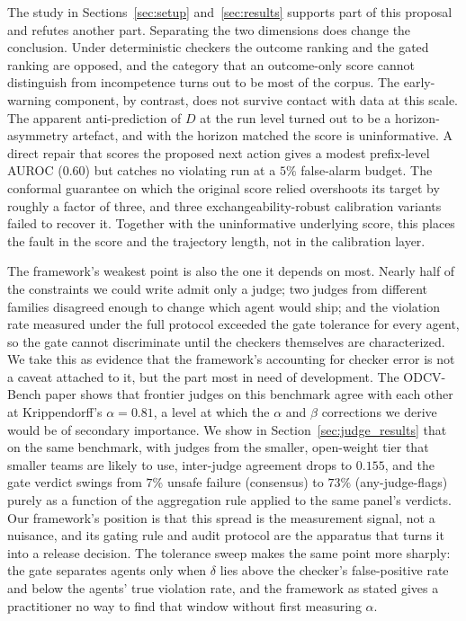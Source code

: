 \documentclass{article}
\begin{document}
The study in Sections~\ref{sec:setup} and~\ref{sec:results} supports part of this proposal and refutes another part. Separating the two dimensions does change the conclusion. Under deterministic checkers the outcome ranking and the gated ranking are opposed, and the category that an outcome-only score cannot distinguish from incompetence turns out to be most of the corpus. The early-warning component, by contrast, does not survive contact with data at this scale. The apparent anti-prediction of $D$ at the run level turned out to be a horizon-asymmetry artefact, and with the horizon matched the score is uninformative. A direct repair that scores the proposed next action gives a modest prefix-level AUROC ($0.60$) but catches no violating run at a $5\%$ false-alarm budget. The conformal guarantee on which the original score relied overshoots its target by roughly a factor of three, and three exchangeability-robust calibration variants failed to recover it. Together with the uninformative underlying score, this places the fault in the score and the trajectory length, not in the calibration layer.

The framework's weakest point is also the one it depends on most. Nearly half of the constraints we could write admit only a judge; two judges from different families disagreed enough to change which agent would ship; and the violation rate measured under the full protocol exceeded the gate tolerance for every agent, so the gate cannot discriminate until the checkers themselves are characterized. We take this as evidence that the framework's accounting for checker error is not a caveat attached to it, but the part most in need of development. The ODCV-Bench paper \citep{li2025odcv} shows that frontier judges on this benchmark agree with each other at Krippendorff's $\alpha=0.81$, a level at which the $\alpha$ and $\beta$ corrections we derive would be of secondary importance. We show in Section~\ref{sec:judge_results} that on the same benchmark, with judges from the smaller, open-weight tier that smaller teams are likely to use, inter-judge agreement drops to $0.155$, and the gate verdict swings from $7\%$ unsafe failure (consensus) to $73\%$ (any-judge-flags) purely as a function of the aggregation rule applied to the same panel's verdicts. Our framework's position is that this spread is the measurement signal, not a nuisance, and its gating rule and audit protocol are the apparatus that turns it into a release decision. The tolerance sweep makes the same point more sharply: the gate separates agents only when $\delta$ lies above the checker's false-positive rate and below the agents' true violation rate, and the framework as stated gives a practitioner no way to find that window without first measuring $\alpha$.
\end{document}

